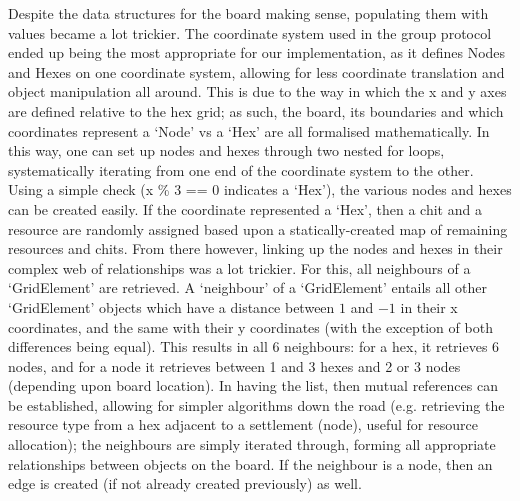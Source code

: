\documentclass[a4paper,doc,draftfirst]{apa6}
\begin{document}
Despite the data structures for the board making sense, populating them with values became a lot trickier. The coordinate system used in the group protocol ended up being the most appropriate for our implementation, as it defines Nodes and Hexes on one coordinate system, allowing for less coordinate translation and object manipulation all around. This is due to the way in which the x and y axes are defined relative to the hex grid; as such, the board, its boundaries and which coordinates represent a ‘Node’ vs a ‘Hex’ are all formalised mathematically. In this way, one can set up nodes and hexes through two nested for loops, systematically iterating from one end of the coordinate system to the other. Using a simple check (x \% 3 == 0 indicates a ‘Hex’), the various nodes and hexes can be created easily. If the coordinate represented a ‘Hex’, then a chit and a resource are randomly assigned based upon a statically-created map of remaining resources and chits. From there however, linking up the nodes and hexes in their complex web of relationships was a lot trickier. For this, all neighbours of a ‘GridElement’ are retrieved. A ‘neighbour’ of a ‘GridElement’ entails all other ‘GridElement’ objects which have a distance between $1$ and $-1$ in their x coordinates, and the same with their y coordinates (with the exception of both differences being equal). This results in all 6 neighbours: for a hex, it retrieves 6 nodes, and for a node it retrieves between 1 and 3 hexes and 2 or 3 nodes (depending upon board location). In having the list, then mutual references can be established, allowing for simpler algorithms down the road (e.g. retrieving the resource type from a hex adjacent to a settlement (node), useful for resource allocation); the neighbours are simply iterated through, forming all appropriate relationships between objects on the board. If the neighbour is a node, then an edge is created (if not already created previously) as well.
\end{document}
